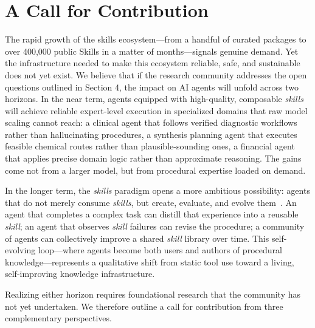 \documentclass[sigconf,nonacm]{acmart}
\begin{document}

\vspace{-8pt}
\section{A Call for Contribution}
The rapid growth of the skills ecosystem—from a handful of curated packages to over 400,000 public Skills in a matter of months—signals genuine demand. Yet the infrastructure needed to make this ecosystem reliable, safe, and sustainable does not yet exist. We believe that if the research community addresses the open questions outlined in Section 4, the impact on AI agents will unfold across two horizons.
In the near term, agents equipped with high-quality, composable \emph{skills} will achieve reliable expert-level execution in specialized domains that raw model scaling cannot reach: a clinical agent that follows verified diagnostic workflows rather than hallucinating procedures, a synthesis planning agent that executes feasible chemical routes rather than plausible-sounding ones, a financial agent that applies precise domain logic rather than approximate reasoning. The gains come not from a larger model, but from procedural expertise loaded on demand.

In the longer term, the \emph{skills} paradigm opens a more ambitious possibility: agents that do not merely consume \emph{skills}, but create, evaluate, and evolve them~\cite{skillrl2026,yang2026autoskill}. An agent that completes a complex task can distill that experience into a reusable \emph{skill}; an agent that observes \emph{skill} failures can revise the procedure; a community of agents can collectively improve a shared \emph{skill} library over time. This self-evolving loop—where agents become both users and authors of procedural knowledge—represents a qualitative shift from static tool use toward a living, self-improving knowledge infrastructure. 

Realizing either horizon requires foundational research that the community has not yet undertaken. We therefore outline a call for contribution from three complementary perspectives.
\end{document}
